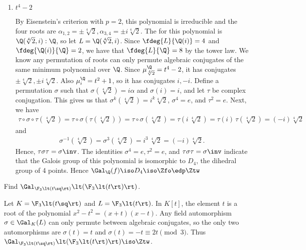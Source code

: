 \documentclass{article}
\begin{document}
\begin{enumerate}
\item $ t^4-2 $
  \begin{solution}
    By Eisenstein's criterion with $ p=2 $, this polynomial is irreducible and the four roots are $ \alpha_{1,2} = \pm\sqrt[4]2, \alpha_{3,4}=\pm i\sqrt[4]2 $.
    The \sfe for this polynomial is $ \Q(\sqrt[4]2,i):\Q $, so let $ L = \Q(\sqrt[4]2, i) $.
    Since $ \fdeg{L}{\Q(i)} = 4 $ and $ \fdeg{\Q(i)}{\Q}=2 $, we have that $ \fdeg{L}{\Q} = 8 $ by the tower law.
    We know any permutation of roots can only permute algebraic conjugates of the same minimum polynomial over $ \Q $.
    Since $ \mu_{\sqrt[4]{2}}^\Q=t^4-2 $, it has conjugates $ \pm\sqrt[4]2,\pm i\sqrt[4]2 $.
    Also $ \mu_i^\Q=t^2+1 $, so it has conjugates $ i,-i $.
    Define a permutation $ \sigma $ such that $ \sigma(\sqrt[4]{2})=i\alpha $ and $ \sigma(i)=i $, and let $ \tau $ be complex conjugation.
    This gives us that $ \sigma^k(\sqrt[4]2) = i^k\sqrt[4]{2} $, $ \sigma^4=e $, and $ \tau^2 = e $.
    Next, we have \begin{align*}
      \tau\circ\sigma\circ\tau(\sqrt[4]{2})=\tau\circ\sigma(\tau(\sqrt[4]{2}))=\tau\circ\sigma(\sqrt[4]{2})=\tau(i\,\sqrt[4]{2})=\tau(i)\,\tau(\sqrt[4]{2})=(-i)\sqrt[4]{2}
    \end{align*}
    and
    \begin{align*}
      \sigma^{-1}(\sqrt[4]{2})=\sigma^3(\sqrt[4]{2})= i^3\,\sqrt[4]{2} = (-i)\sqrt[4]{2}.
    \end{align*}
    Hence, $ \tau\sigma\tau = \sigma\inv $.
    The identities $ \sigma^4 = e,\tau^2 = e $, and $ \tau\sigma\tau = \sigma\inv $ indicate that the Galois group of this polynomial is isomorphic to $ D_4 $, the dihedral group of 4 points.
    Hence $ \Gal_\Q(f) \iso D_4 \iso \Zfo\edp\Ztw  $
  \end{solution}
\end{enumerate}

\begin{subexercise}
  Find $ \Gal_{\F_3\lt(t\sq\rt)}\lt(\F_3\lt(t\rt)\rt) $.
\end{subexercise}
\begin{solution}
  Let $ K = \F_3\lt(t\sq\rt)$ and $ L = \F_3\lt(t\rt) $.
  In $ K[t] $, the element $ t $ is a root of the polynomial $ x^2-t^2 = (x+t)(x-t) $.
  Any field automorphism $ \sigma\in \Gal_K(L) $ can only permute between algebraic conjugates, so the only two automorphisms are $ \sigma(t) = t $ and $ \sigma(t) = -t \equiv 2t \pmod 3 $.
  Thus $ \Gal_{\F_3\lt(t\sq\rt)}\lt(\F_3\lt(t\rt)\rt) \iso \Ztw $.
\end{solution}
\end{document}
